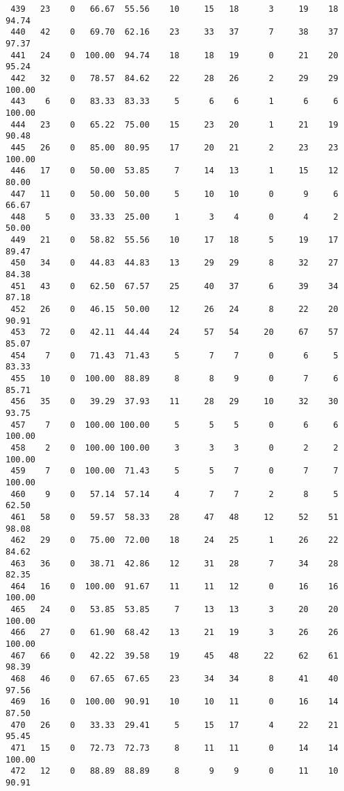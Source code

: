 \begin{verbatim}
 439   23    0   66.67  55.56    10     15   18      3     19    18    94.74
 440   42    0   69.70  62.16    23     33   37      7     38    37    97.37
 441   24    0  100.00  94.74    18     18   19      0     21    20    95.24
 442   32    0   78.57  84.62    22     28   26      2     29    29   100.00
 443    6    0   83.33  83.33     5      6    6      1      6     6   100.00
 444   23    0   65.22  75.00    15     23   20      1     21    19    90.48
 445   26    0   85.00  80.95    17     20   21      2     23    23   100.00
 446   17    0   50.00  53.85     7     14   13      1     15    12    80.00
 447   11    0   50.00  50.00     5     10   10      0      9     6    66.67
 448    5    0   33.33  25.00     1      3    4      0      4     2    50.00
 449   21    0   58.82  55.56    10     17   18      5     19    17    89.47
 450   34    0   44.83  44.83    13     29   29      8     32    27    84.38
 451   43    0   62.50  67.57    25     40   37      6     39    34    87.18
 452   26    0   46.15  50.00    12     26   24      8     22    20    90.91
 453   72    0   42.11  44.44    24     57   54     20     67    57    85.07
 454    7    0   71.43  71.43     5      7    7      0      6     5    83.33
 455   10    0  100.00  88.89     8      8    9      0      7     6    85.71
 456   35    0   39.29  37.93    11     28   29     10     32    30    93.75
 457    7    0  100.00 100.00     5      5    5      0      6     6   100.00
 458    2    0  100.00 100.00     3      3    3      0      2     2   100.00
 459    7    0  100.00  71.43     5      5    7      0      7     7   100.00
 460    9    0   57.14  57.14     4      7    7      2      8     5    62.50
 461   58    0   59.57  58.33    28     47   48     12     52    51    98.08
 462   29    0   75.00  72.00    18     24   25      1     26    22    84.62
 463   36    0   38.71  42.86    12     31   28      7     34    28    82.35
 464   16    0  100.00  91.67    11     11   12      0     16    16   100.00
 465   24    0   53.85  53.85     7     13   13      3     20    20   100.00
 466   27    0   61.90  68.42    13     21   19      3     26    26   100.00
 467   66    0   42.22  39.58    19     45   48     22     62    61    98.39
 468   46    0   67.65  67.65    23     34   34      8     41    40    97.56
 469   16    0  100.00  90.91    10     10   11      0     16    14    87.50
 470   26    0   33.33  29.41     5     15   17      4     22    21    95.45
 471   15    0   72.73  72.73     8     11   11      0     14    14   100.00
 472   12    0   88.89  88.89     8      9    9      0     11    10    90.91

\end{verbatim}
